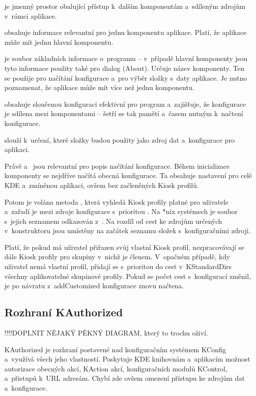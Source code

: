  je jmenný prostor obalující přístup k~dalším komponentám a~sdíleným zdrojům v~rámci aplikace.

 obsahuje informace relevantní pro jednu komponentu aplikace. Platí, že aplikace může mít jednu hlavní komponentu.

 je soubor základních informace o~programu -- v~případě hlavní komponenty jsou tyto informace použity také pro dialog  (About). Určuje název komponenty. Ten se použije pro načítání konfigurace a~pro výběr složky s~daty aplikace. Je nutno poznamenat, že aplikace může mít více než jednu komponentu.

 obsahuje sloučenou konfiguraci efektivní pro program a~zajišťuje, že konfigurace je sdílena mezi komponentami -- šetří se tak pamětí a~časem nutným k~načtení konfigurace.

 slouží k~určení, které složky budou použity jako zdroj dat a~konfigurace pro aplikaci.

Právě  a~ jsou relevantní pro popis načítání konfigurace. Během inicializace komponenty se nejdříve načítá obecná konfigurace. Ta obsahuje nastavení pro celé KDE a~zmíněnou aplikaci, ovšem bez začleněných Kiosk profilů.

Potom je volána metoda , která vyhledá Kiosk profily platné pro uživatele a~zařadí je mezi zdroje konfigurace s~prioritou . Na *nix systémech je soubor s~jejich seznamem odkazován z~. Na rozdíl od cest ke zdrojům určených v~konstruktoru  jsou umístěny na začátek seznamu složek s~konfiguračními zdroji.

Platí, že pokud má uživatel přiřazen svůj vlastní Kiosk profil, nezpracovávají se dále Kiosk profily pro skupiny v~nichž je členem. V~opačném případě, kdy uživatel nemá vlastní profil, přidají se s~prioritou do cest v~KStandardDirs všechny aplikovatelné skupinové profily. Pokud se počet cest s~konfigurací změnil, je po návratu z~addCustomized konfigurace znovu načtena.

\subsection*{Rozhraní KAuthorized}
!!!!DOPLNIT NĚJAKÝ PĚKNÝ DIAGRAM, který to trochu oživí.

KAuthorized je rozhraní postavené nad konfiguračním systémem KConfig a~využívá všech jeho vlastností. Poskytuje KDE knihovnám a~aplikacím možnost autorizace obecných akcí, KAction akcí, konfiguračních modulů KControl, a~přistupů k~URL adresám. Chybí zde ovšem omezení přístupu ke zdrojům dat a~konfigurace.

